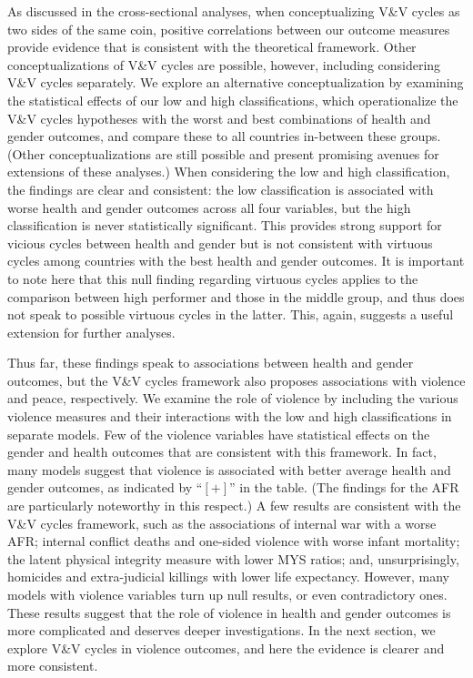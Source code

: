 \documentclass[12pt]{article}
\begin{document}
As discussed in the cross-sectional analyses, when conceptualizing V\&V cycles as two sides of the same coin, positive correlations between our outcome measures provide evidence that is consistent with the theoretical framework.
Other conceptualizations of V\&V cycles are possible, however, including considering V\&V cycles separately.
We explore an alternative conceptualization by examining the statistical effects of our low and high classifications, which operationalize the V\&V cycles hypotheses with the worst and best combinations of health and gender outcomes, and compare these to all countries in-between these groups. (Other conceptualizations are still possible and present promising avenues for extensions of these analyses.)
When considering the low and high classification, the findings are clear and consistent: the low classification is associated with worse health and gender outcomes across all four variables, but the high classification is never statistically significant.
This provides strong support for vicious cycles between health and gender but is not consistent with virtuous cycles among countries with the best health and gender outcomes.
It is important to note here that this null finding regarding virtuous cycles applies to the comparison between high performer and those in the middle group, and thus does not speak to possible virtuous cycles in the latter. This, again, suggests a useful extension for further analyses.

Thus far, these findings speak to associations between health and gender outcomes, but the V\&V cycles framework also proposes associations with violence and peace, respectively.
We examine the role of violence by including the various violence measures and their interactions with the low and high classifications in separate models.
Few of the violence variables have statistical effects on the gender and health outcomes that are consistent with this framework.
In fact, many models suggest that violence is associated with better average health and gender outcomes, as indicated by \enquote{$[+]$} in the table.
(The findings for the AFR are particularly noteworthy in this respect.)
A few results are consistent with the V\&V cycles framework, such as the associations of internal war with a worse AFR; internal conflict deaths and one-sided violence with worse infant mortality; the latent physical integrity measure with lower MYS ratios; and, unsurprisingly, homicides and extra-judicial killings with lower life expectancy.
However, many models with violence variables turn up null results, or even contradictory ones.
These results suggest that the role of violence in health and gender outcomes is more complicated and deserves deeper investigations.
In the next section, we explore V\&V cycles in violence outcomes, and here the evidence is clearer and more consistent.
\end{document}
